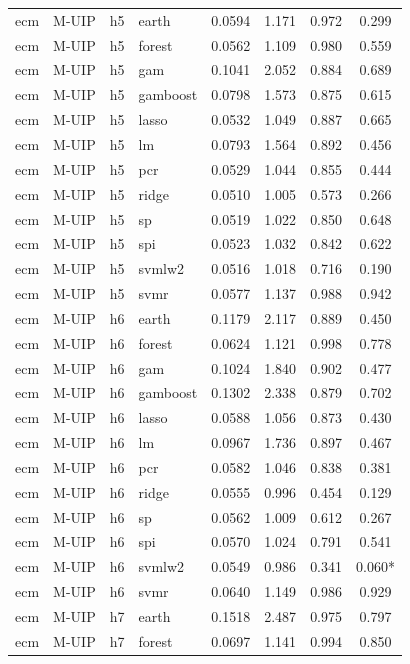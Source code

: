 \begin{ThreePartTable}
\begin{longtable}[t]{llclcccc}
\addlinespace
ecm & M-UIP & h5 & earth & 0.0594 & 1.171 & 0.972 & 0.299\\
ecm & M-UIP & h5 & forest & 0.0562 & 1.109 & 0.980 & 0.559\\
ecm & M-UIP & h5 & gam & 0.1041 & 2.052 & 0.884 & 0.689\\
ecm & M-UIP & h5 & gamboost & 0.0798 & 1.573 & 0.875 & 0.615\\
ecm & M-UIP & h5 & lasso & 0.0532 & 1.049 & 0.887 & 0.665\\
ecm & M-UIP & h5 & lm & 0.0793 & 1.564 & 0.892 & 0.456\\
ecm & M-UIP & h5 & pcr & 0.0529 & 1.044 & 0.855 & 0.444\\
ecm & M-UIP & h5 & ridge & 0.0510 & 1.005 & 0.573 & 0.266\\
ecm & M-UIP & h5 & sp & 0.0519 & 1.022 & 0.850 & 0.648\\
ecm & M-UIP & h5 & spi & 0.0523 & 1.032 & 0.842 & 0.622\\
ecm & M-UIP & h5 & svmlw2 & 0.0516 & 1.018 & 0.716 & 0.190\\
ecm & M-UIP & h5 & svmr & 0.0577 & 1.137 & 0.988 & 0.942\\
\addlinespace
ecm & M-UIP & h6 & earth & 0.1179 & 2.117 & 0.889 & 0.450\\
ecm & M-UIP & h6 & forest & 0.0624 & 1.121 & 0.998 & 0.778\\
ecm & M-UIP & h6 & gam & 0.1024 & 1.840 & 0.902 & 0.477\\
ecm & M-UIP & h6 & gamboost & 0.1302 & 2.338 & 0.879 & 0.702\\
ecm & M-UIP & h6 & lasso & 0.0588 & 1.056 & 0.873 & 0.430\\
ecm & M-UIP & h6 & lm & 0.0967 & 1.736 & 0.897 & 0.467\\
ecm & M-UIP & h6 & pcr & 0.0582 & 1.046 & 0.838 & 0.381\\
ecm & M-UIP & h6 & ridge & 0.0555 & 0.996 & 0.454 & 0.129\\
ecm & M-UIP & h6 & sp & 0.0562 & 1.009 & 0.612 & 0.267\\
ecm & M-UIP & h6 & spi & 0.0570 & 1.024 & 0.791 & 0.541\\
ecm & M-UIP & h6 & svmlw2 & 0.0549 & 0.986 & 0.341 & 0.060*\\
ecm & M-UIP & h6 & svmr & 0.0640 & 1.149 & 0.986 & 0.929\\
\addlinespace
ecm & M-UIP & h7 & earth & 0.1518 & 2.487 & 0.975 & 0.797\\
ecm & M-UIP & h7 & forest & 0.0697 & 1.141 & 0.994 & 0.850\\

\end{longtable}
\end{ThreePartTable}
